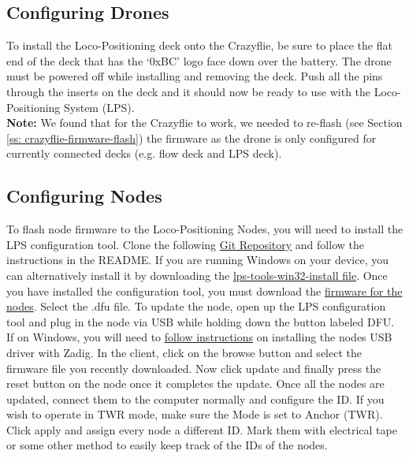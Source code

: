 \documentclass[]{article}
\begin{document}
\subsection{Configuring Drones}

\noindent To install the Loco-Positioning deck onto the Crazyflie, be sure to place the flat end of the deck that has the `0xBC' logo face down over the battery. The drone must be powered off while installing and removing the deck. Push all the pins through the inserts on the deck and it should now be ready to use with the Loco-Positioning System (LPS). \\

{\bfseries Note:} We found that for the Crazyflie to work, we needed to re-flash (see Section \ref{ss: crazyflie-firmware-flash}) the firmware as the drone is only configured for currently connected decks (e.g. flow deck and LPS deck). \\

\subsection{Configuring Nodes}

\noindent To flash node firmware to the Loco-Positioning Nodes, you will need to install the LPS configuration tool. Clone the following \href{https://github.com/bitcraze/lps-tools}{Git Repository} and follow the instructions in the README. If you are running Windows on your device, you can alternatively install it by downloading the \href{https://github.com/bitcraze/lps-tools/releases}{lps-tools-win32-install file}. Once you have installed the configuration tool, you must download the \href{https://github.com/bitcraze/lps-node-firmware/releases}{firmware for the nodes}. Select the .dfu file. To update the node, open up the LPS configuration tool and plug in the node via USB while holding down the button labeled DFU. If on Windows, you will need to \href{https://wiki.bitcraze.io/misc:usbwindows}{follow instructions} on installing the nodes USB driver with Zadig. In the client, click on the browse button and select the firmware file you recently downloaded. Now click update and finally press the reset button on the node once it completes the update. Once all the nodes are updated, connect them to the computer normally and configure the ID. If you wish to operate in TWR mode, make sure the Mode is set to Anchor (TWR). Click apply and assign every node a different ID. Mark them with electrical tape or some other method to easily keep track of the IDs of the nodes.
\end{document}
